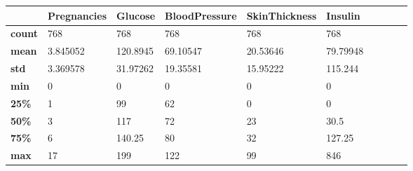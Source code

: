 \documentclass[12pt]{article}
\begin{document}
\begin{table}[]
\begin{tabular}{@{}llllllllll@{}}
\toprule
               & \textbf{Pregnancies} & \textbf{Glucose} & \textbf{BloodPressure} & \textbf{SkinThickness} & \textbf{Insulin} &  &  &  &  \\ \midrule
\textbf{count} & 768                  & 768              & 768                    & 768                    & 768              &  &  &  &  \\
\textbf{mean}  & 3.845052             & 120.8945         & 69.10547               & 20.53646               & 79.79948         &  &  &  &  \\
\textbf{std}   & 3.369578             & 31.97262         & 19.35581               & 15.95222               & 115.244          &  &  &  &  \\
\textbf{min}   & 0                    & 0                & 0                      & 0                      & 0                &  &  &  &  \\
\textbf{25\%}  & 1                    & 99               & 62                     & 0                      & 0                &  &  &  &  \\
\textbf{50\%}  & 3                    & 117              & 72                     & 23                     & 30.5             &  &  &  &  \\
\textbf{75\%}  & 6                    & 140.25           & 80                     & 32                     & 127.25           &  &  &  &  \\
\textbf{max}   & 17                   & 199              & 122                    & 99                     & 846              &  &  &  &  \\ \bottomrule
\end{tabular}
\end{table}
\end{document}
